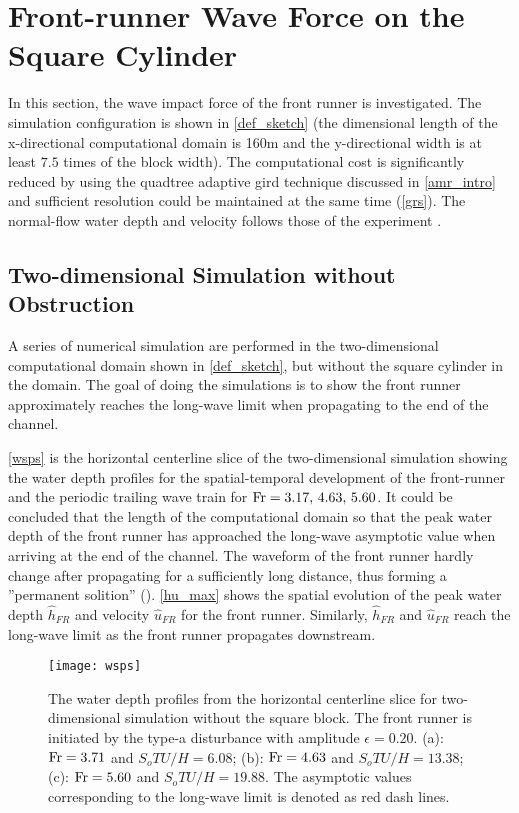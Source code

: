 \documentclass{jfm}
\newcommand{\fr}{{\rm{Fr}}}
\begin{document}
\section{Front-runner Wave Force on the Square Cylinder}
In this section, the wave impact force of the front runner is investigated. The simulation configuration is shown in \autoref{def_sketch} (the dimensional length of the x-directional computational domain is 160m and the y-directional width is at least $7.5$ times of the block width). The computational cost is significantly reduced by using the quadtree adaptive gird technique discussed in \autoref{amr_intro} and sufficient resolution could be maintained at the same time (\autoref{grs}). The normal-flow water depth and velocity follows those of the experiment \cite{Brock1967}.

\subsection{Two-dimensional Simulation without Obstruction}
A series of numerical simulation are performed in the two-dimensional computational domain shown in \autoref{def_sketch}, but without the square cylinder in the domain. The goal of doing the simulations is to show the front runner approximately reaches the long-wave limit when propagating to the end of the channel.

\autoref{wsps} is the horizontal centerline slice of the two-dimensional simulation showing the water depth profiles for the spatial-temporal development of the front-runner and the periodic trailing wave train for $\fr=3.17,\,4.63,\,5.60$. It could be concluded that the length of the computational domain so that the peak water depth of the front runner has approached the long-wave asymptotic value when arriving at the end of the channel. The waveform of the front runner hardly change after propagating for a sufficiently long distance, thus forming a ''permanent solition'' (\cite{Liu1994}).  \autoref{hu_max} shows the spatial evolution of the peak water depth $\hat{h}_{FR}$ and velocity $\hat{u}_{FR}$ for the front runner. Similarly, $\hat{h}_{FR}$ and $\hat{u}_{FR}$ reach the long-wave limit as the front runner propagates downstream.

\begin{figure}
	\centerline{\texttt{[image: wsps]}}
	\caption{The water depth profiles from  the horizontal centerline slice  for two-dimensional simulation without the square block. The front runner is initiated by the type-a disturbance with amplitude $\epsilon=0.20$. (a): $\fr=3.71$ and $S_oTU/H=6.08$; (b): $\fr=4.63$ and $S_oTU/H=13.38$; (c): $\fr=5.60$ and $S_oTU/H=19.88$. The asymptotic values corresponding to the long-wave limit is denoted as red dash lines.}
	\label{wsps}
\end{figure}
\end{document}
